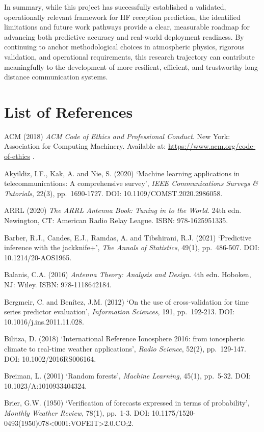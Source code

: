 In summary, while this project has successfully established a validated,
operationally relevant framework for HF reception prediction, the
identified limitations and future work pathways provide a clear,
measurable roadmap for advancing both predictive accuracy and real-world
deployment readiness. By continuing to anchor methodological choices in
atmospheric physics, rigorous validation, and operational requirements,
this research trajectory can contribute meaningfully to the development
of more resilient, efficient, and trustworthy long-distance
communication systems.

\section{List of References}\label{list-of-references}

ACM (2018) \emph{ACM Code of Ethics and Professional Conduct}. New York:
Association for Computing Machinery. Available at:
\url{https://www.acm.org/code-of-ethics} .

Akyildiz, I.F., Kak, A. and Nie, S. (2020) `Machine learning
applications in telecommunications: A comprehensive survey', \emph{IEEE
Communications Surveys \& Tutorials}, 22(3), pp.~1690-1727. DOI:
10.1109/COMST.2020.2986058.

ARRL (2020) \emph{The ARRL Antenna Book: Tuning in to the World}. 24th
edn. Newington, CT: American Radio Relay League. ISBN: 978-1625951335.

Barber, R.J., Candes, E.J., Ramdas, A. and Tibshirani, R.J. (2021)
`Predictive inference with the jackknife+', \emph{The Annals of
Statistics}, 49(1), pp.~486-507. DOI: 10.1214/20-AOS1965.

Balanis, C.A. (2016) \emph{Antenna Theory: Analysis and Design}. 4th
edn. Hoboken, NJ: Wiley. ISBN: 978-1118642184.

Bergmeir, C. and Benítez, J.M. (2012) `On the use of cross-validation
for time series predictor evaluation', \emph{Information Sciences}, 191,
pp.~192-213. DOI: 10.1016/j.ins.2011.11.028.

Bilitza, D. (2018) `International Reference Ionosphere 2016: from
ionospheric climate to real-time weather applications', \emph{Radio
Science}, 52(2), pp.~129-147. DOI: 10.1002/2016RS006164.

Breiman, L. (2001) `Random forests', \emph{Machine Learning}, 45(1),
pp.~5-32. DOI: 10.1023/A:1010933404324.

Brier, G.W. (1950) `Verification of forecasts expressed in terms of
probability', \emph{Monthly Weather Review}, 78(1), pp.~1-3. DOI:
10.1175/1520-0493(1950)078\textless0001:VOFEIT\textgreater2.0.CO;2.

